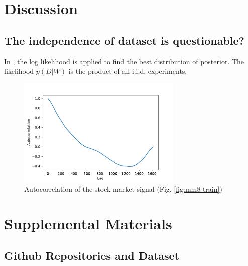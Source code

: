 \documentclass{article}
\newcommand{\beginsupplement}{%
        \setcounter{table}{0}
        \renewcommand{\thetable}{S\arabic{table}}%
        \setcounter{figure}{0}
        \renewcommand{\thefigure}{S\arabic{figure}}%
        \setcounter{section}{0}
        \renewcommand{\thesection}{S\arabic{section}}%
        \setcounter{equation}{0}
        \renewcommand{\theequation}{S\arabic{equation}}%
     }
\begin{document}
\section{Discussion}

\subsection{The independence of dataset is questionable?}

In \cite{chandra2021bayesian}, the log likelihood is applied to find the best distribution of posterior. The likelihood $p(D|W)$ is the product of all i.i.d. experiments.


\begin{figure}[h]
    \centering
    \includegraphics[width=0.7\textwidth]{../img/autocorrelation.pdf}
    \caption{Autocorrelation of the stock market signal (Fig. \ref{fig:mm8-train})}
    \label{fig:auto}
\end{figure}



\beginsupplement
\section{Supplemental Materials}

\subsection{Github Repositories and Dataset}
\end{document}
